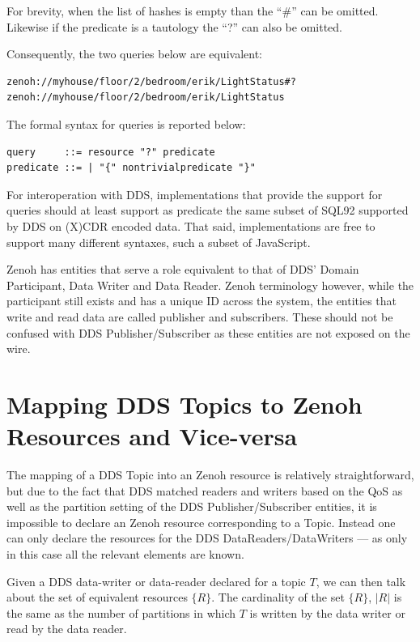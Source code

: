 \documentclass[a4paper,oneside,article]{memoir}
\begin{document}
For brevity, when the list of hashes is empty than the ``\#'' can be omitted. Likewise if the
predicate is a tautology the ``?'' can also be omitted.

Consequently, the two queries below are equivalent:
\begin{verbatim}
zenoh://myhouse/floor/2/bedroom/erik/LightStatus#?
zenoh://myhouse/floor/2/bedroom/erik/LightStatus
\end{verbatim}

The formal syntax for queries is reported below:

\begin{verbatim}
query     ::= resource "?" predicate
predicate ::= | "{" nontrivialpredicate "}"
\end{verbatim}

For interoperation with DDS, implementations that provide the support for queries should at least
support as predicate the same subset of SQL92 supported by DDS on (X)CDR encoded data.  That said,
implementations are free to support many different syntaxes, such a subset of JavaScript.

Zenoh has entities that serve a role equivalent to that of DDS' Domain Participant, Data Writer and
Data Reader.  Zenoh terminology however, while the participant still exists and has a unique ID
across the system, the entities that write and read data are called publisher and subscribers. These
should not be confused with DDS Publisher/Subscriber as these entities are not exposed on the wire.

\section{Mapping DDS Topics to Zenoh Resources and Vice-versa}

The mapping of a DDS Topic into an Zenoh resource is relatively straightforward, but due to the fact
that DDS matched readers and writers based on the QoS as well as the partition setting of the DDS
Publisher/Subscriber entities, it is impossible to declare an Zenoh resource corresponding to a
Topic. Instead one can only declare the resources for the DDS DataReaders/DataWriters — as only in
this case all the relevant elements are known.

Given a DDS data-writer or data-reader declared for a topic $T$, we can then talk about the set of
equivalent resources $\{ R \}$. The cardinality of the set $\{ R \}$, $|R|$ is the same as the
number of partitions in which $T$ is written by the data writer or read by the data reader.
\end{document}
